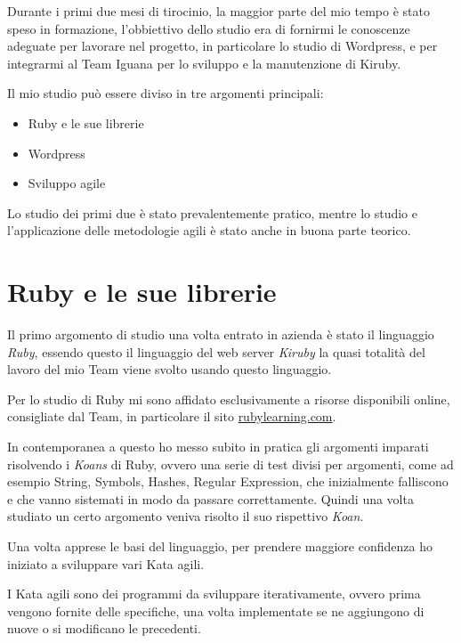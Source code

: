 


Durante i primi due mesi di tirocinio, la maggior parte del mio tempo è stato speso in formazione,
l'obbiettivo dello studio era di fornirmi le conoscenze adeguate per lavorare nel progetto, in particolare lo studio
di Wordpress, e per integrarmi al Team Iguana per lo sviluppo e la manutenzione di Kiruby.


Il mio studio può essere diviso in tre argomenti principali:
\begin{itemize}
\item Ruby e le sue librerie
\item Wordpress
\item Sviluppo agile
\end{itemize}

Lo studio dei primi due è stato prevalentemente pratico, mentre lo studio e l'applicazione
delle metodologie agili è stato anche in buona parte teorico.

\section{Ruby e le sue librerie}

Il primo argomento di studio una volta entrato in azienda è stato il linguaggio \emph{Ruby}, essendo questo il
linguaggio del web server \emph{Kiruby} la quasi totalità del lavoro del mio Team viene svolto usando questo linguaggio.

Per lo studio di Ruby mi sono affidato esclusivamente a risorse disponibili online, consigliate dal Team,
in particolare il sito \url{rubylearning.com}\cite{RUBY}.

In contemporanea a questo ho messo subito in pratica gli argomenti imparati risolvendo i \emph{Koans}\cite{KOANS}
di Ruby, ovvero una serie di test divisi per argomenti, come ad esempio String, Symbols, Hashes, Regular Expression, 
che inizialmente falliscono e che vanno sistemati in modo da passare correttamente. Quindi una volta studiato un certo argomento
veniva risolto il suo rispettivo \emph{Koan}. 

Una volta apprese le basi del linguaggio, per prendere maggiore confidenza ho iniziato a sviluppare
vari Kata agili.

I Kata agili sono dei programmi da sviluppare iterativamente, ovvero prima vengono fornite delle specifiche, una volta 
implementate se ne aggiungono di nuove o si modificano le precedenti. 

